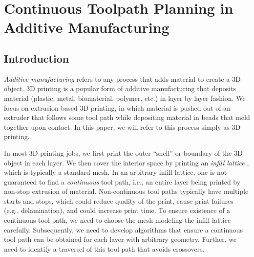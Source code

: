 \chapter{Continuous Toolpath Planning in Additive Manufacturing}

\section{Introduction} \label{sec:introadditiv}

\emph{Additive manufacturing} refers to any process that adds material  to create a 3D object. %
3D printing is a popular form of additive manufacturing that deposits material (plastic, metal, biomaterial, polymer, etc.) in layer by layer fashion. %
We focus on extrusion based 3D printing, in which material is pushed out of an extruder that follows some tool path while depositing material in beads that meld together upon contact.
In this paper, we will refer to this process simply as 3D printing.


In most 3D printing jobs, we first print the outer ``shell'' or boundary of the 3D object in each layer.
We then cover the interior space by printing an \emph{infill lattice} \cite{WuAaWeSi2018}, which is typically a standard mesh. %
In an arbitrary infill lattice, one is not guaranteed to find a \emph{continuous} tool path, i.e., an entire layer being printed by non-stop extrusion of material.
Non-continuous tool paths typically have multiple starts and stops, which could reduce quality of the print, cause print failures (e.g., delamination), and could increase print time.
To ensure existence of a continuous tool path, we need to choose the mesh modeling the infill lattice carefully.
Subsequently, we need to develop algorithms that ensure a continuous tool path can be obtained for each layer with arbitrary geometry.
Further, we need to identify a traversel of this tool path that avoids crossovers.

